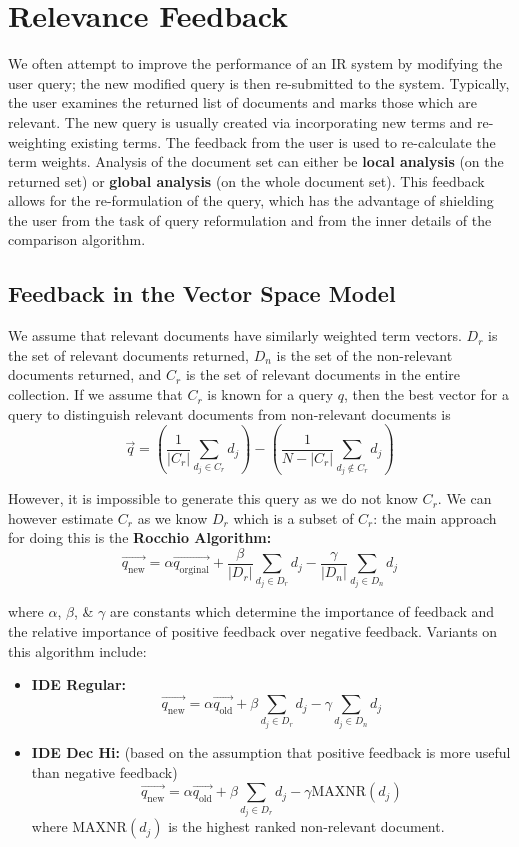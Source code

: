 \documentclass[a4paper,11pt]{article}
\begin{document}
\section{Relevance Feedback}
We often attempt to improve the performance of an IR system by modifying the user query;
the new modified query is then re-submitted to the system.
Typically, the user examines the returned list of documents and marks those which are relevant.
The new query is usually created via incorporating new terms and re-weighting existing terms.
The feedback from the user is used to re-calculate the term weights.
Analysis of the document set can either be \textbf{local analysis} (on the returned set) or \textbf{global analysis} (on the whole document set).
This feedback allows for the re-formulation of the query, which has the advantage of shielding the user from the task of query reformulation and from the inner details of the comparison algorithm.

\subsection{Feedback in the Vector Space Model}
We assume that relevant documents have similarly weighted term vectors.
$D_r$ is the set of relevant documents returned, $D_n$ is the set of the non-relevant documents returned, and $C_r$ is the set of relevant documents in the entire collection.
If we assume that $C_r$ is known for a query $q$, then the best vector for a query to distinguish relevant documents from non-relevant documents is
\[
    \vec{q} = \left( \frac{1}{\left|C_r\right|} \sum_{d_j \in C_r}d_j \right) - \left( \frac{1}{N - \left|C_r\right|} \sum_{d_j \notin C_r} d_j \right)
\]

However, it is impossible to generate this query as we do not know $C_r$.
We can however estimate $C_r$ as we know $D_r$ which is a subset of $C_r$: the main approach for doing this is the \textbf{Rocchio Algorithm:}
\[
    \overrightarrow{q_{\text{new}}} = \alpha \overrightarrow{q_\text{orginal}} + \frac{\beta}{\left| D_r \right|} \sum_{d_j \in D_r} d_j - \frac{\gamma}{\left| D_n \right|} \sum_{d_j \in D_n}d_j
\]

where $\alpha$, $\beta$, \& $\gamma$ are constants which determine the importance of feedback and the relative importance of positive feedback over negative feedback.
Variants on this algorithm include:
\begin{itemize}
    \item   \textbf{IDE Regular:}
            \[
                \overrightarrow{q_\text{new}} = \alpha \overrightarrow{q_\text{old}} + \beta \sum_{d_j \in D_r} d_j - \gamma \sum_{d_j \in D_n} d_j
            \]

    \item   \textbf{IDE Dec Hi:} (based on the assumption that positive feedback is more useful than negative feedback)
            \[
                \overrightarrow{q_\text{new}} = \alpha \overrightarrow{q_\text{old}} + \beta \sum_{d_j \in D_r} d_j - \gamma \text{MAXNR}(d_j)
            \]
            where $\text{MAXNR}(d_j)$ is the highest ranked non-relevant document.
\end{itemize}
\end{document}
